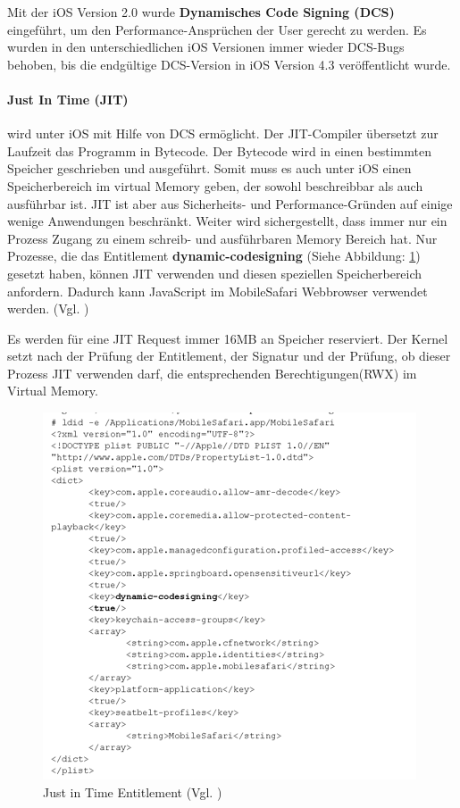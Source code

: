 Mit der iOS Version 2.0 wurde \textbf{Dynamisches Code Signing (DCS)} eingeführt, um den Performance-Ansprüchen der User gerecht zu werden. Es wurden in den unterschiedlichen iOS Versionen immer wieder DCS-Bugs behoben, bis die endgültige DCS-Version in iOS Version 4.3 veröffentlicht wurde. 
\paragraph{Just In Time (JIT)} wird unter iOS mit Hilfe von DCS ermöglicht. Der JIT-Compiler übersetzt zur Laufzeit das Programm in Bytecode. Der Bytecode wird in einen bestimmten Speicher geschrieben und ausgeführt. Somit muss es auch unter iOS einen Speicherbereich im virtual Memory geben, der sowohl beschreibbar als auch ausführbar ist.  JIT ist aber aus Sicherheits- und Performance-Gründen auf einige wenige Anwendungen beschränkt. Weiter wird sichergestellt, dass immer nur ein Prozess Zugang zu einem schreib- und ausführbaren Memory Bereich hat. Nur Prozesse, die das Entitlement \textbf{dynamic-codesigning} (Siehe Abbildung: \ref{fig:JIT}) gesetzt haben, können JIT verwenden und diesen speziellen Speicherbereich anfordern. Dadurch kann JavaScript im MobileSafari Webbrowser verwendet werden. (Vgl. \cite{ASLR[4]})

Es werden für eine JIT Request immer 16MB an Speicher reserviert. Der Kernel setzt nach der Prüfung der Entitlement, der Signatur und der Prüfung, ob dieser Prozess JIT verwenden darf, die entsprechenden Berechtigungen(RWX) im Virtual Memory.

\begin{figure}[htp!]
        \centering
                \includegraphics[scale=0.8]{JIT}
        \caption{Just in Time Entitlement (Vgl. \cite{Hacking[1]}) }
        \label{fig:JIT}
\end{figure}
